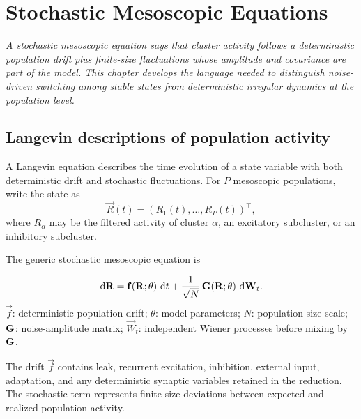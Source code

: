 \chapter{Stochastic Mesoscopic Equations}
\label{ch:stochastic-mesoscopic-equations}

\textit{A stochastic mesoscopic equation says that cluster activity follows a deterministic population drift plus finite-size fluctuations whose amplitude and covariance are part of the model. This chapter develops the language needed to distinguish noise-driven switching among stable states from deterministic irregular dynamics at the population level.}

\section{Langevin descriptions of population activity}
\label{sec:langevin-population-activity}

A Langevin equation describes the time evolution of a state variable with both deterministic drift and stochastic fluctuations. For $P$ mesoscopic populations, write the state as
%
\begin{equation}
  \vec R(t)
  =
  (R_1(t),\ldots,R_P(t))^\top,
  \label{eq:mesoscopic-state-vector}
\end{equation}
%
where $R_\alpha$ may be the filtered activity of cluster $\alpha$, an excitatory subcluster, or an inhibitory subcluster.

The generic stochastic mesoscopic equation is
%
\begin{keyequation}
\begin{equation}
  \mathop{}\!\mathrm{d} \mathbf{R}
  =
  \mathbf{f}(\mathbf{R};\theta)\,\mathop{}\!\mathrm{d} t
  +
  \frac{1}{\sqrt{N}}\,
  \mathbf{G}(\mathbf{R};\theta)\,\mathop{}\!\mathrm{d} \mathbf{W}_t .
  \label{eq:mesoscopic-langevin}
\end{equation}
\tcblower
$\vec f$: deterministic population drift; \quad
$\theta$: model parameters; \quad
$N$: population-size scale; \quad
$\mathbf{G}$: noise-amplitude matrix; \quad
$\vec W_t$: independent Wiener processes before mixing by $\mathbf{G}$.
\end{keyequation}

\noindent The drift $\vec f$ contains leak, recurrent excitation, inhibition, external input, adaptation, and any deterministic synaptic variables retained in the reduction. The stochastic term represents finite-size deviations between expected and realized population activity.


